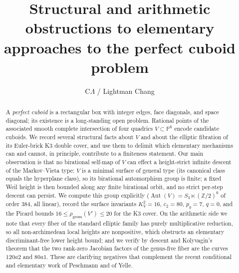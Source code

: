 \documentclass[11pt,reqno]{amsart}
\theoremstyle{plain}
\theoremstyle{definition}
\theoremstyle{remark}
\newcommand{\Z}{\mathbb{Z}}
\newcommand{\PP}{\mathbb{P}}
\newcommand{\Aut}{\operatorname{Aut}}
\begin{document}
\title[Structural and arithmetic obstructions for the perfect cuboid problem]
{Structural and arithmetic obstructions to elementary approaches to the perfect cuboid problem}

\author{C$\Lambda$ / Lightman Chang}
\address{Independent Researcher}



\begin{abstract}
A \emph{perfect cuboid} is a rectangular box with integer edges, face diagonals,
and space diagonal; its existence is a long-standing open problem. Rational points
of the associated smooth complete intersection of four quadrics $V\subset\PP^6$
encode candidate cuboids. We record several structural facts about $V$ and about
the elliptic fibration of its Euler-brick K3 double cover, and use them to delimit
which elementary mechanisms can and cannot, in principle, contribute to a finiteness
statement. Our main observation is that no birational self-map of $V$ can effect a
height-strict infinite descent of the Markov--Vieta type: $V$ is a minimal surface
of general type (its canonical class equals the hyperplane class), so its birational
automorphism group is finite; a fixed Weil height is then bounded along any finite
birational orbit, and no strict per-step descent can persist. We compute this group
explicitly
($\Aut(V)=S_3\ltimes(\Z/2)^6$ of order $384$, all linear), record the surface
invariants $K_V^2=16$, $c_2=80$, $p_g=7$, $q=0$, and the Picard bounds
$16\le\rho_{\mathrm{geom}}(V')\le 20$ for the K3 cover. On the arithmetic side we
note that every fiber of the standard elliptic family has purely multiplicative
reduction, so all non-archimedean local heights are nonpositive, which obstructs an
elementary discriminant-free lower height bound; and we verify by descent and
Kolyvagin's theorem that the two rank-zero Jacobian factors of the genus-five fiber
are the curves $120a2$ and $80a1$. These are clarifying negatives that complement
the recent conditional and elementary work of Peschmann and of Yelle.
\end{abstract}

\maketitle
\end{document}
